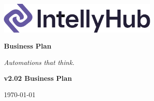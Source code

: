 \documentclass[11pt, a4paper, oneside]{article}
\begin{document}
\thispagestyle{empty} 
\begin{titlepage}
    \centering
    \vspace{1cm}
    
    \includegraphics[width=0.6\textwidth]{IntellyHub_Logo_Colored.png}
    
    \vspace{2.5cm}
    {\Huge\bfseries\color{PrimaryColor}Business Plan}
    
    \vspace{1.5cm}
    
    {\Large\itshape\lightfont Automations that think.}
    
    \vfill %
    
    {\large\bfseries\color{PrimaryColor}v2.02 \color{SecondaryColor}Business Plan}
    
    \vspace{0.5cm}
    
    {\large \today}
    
\end{titlepage}

\tableofcontents
\newpage

\end{document}
